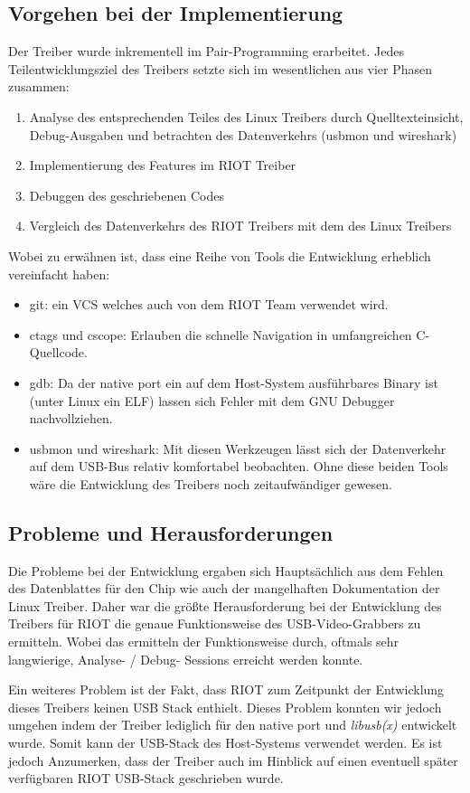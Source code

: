\subsection{Vorgehen bei der Implementierung}
Der Treiber wurde inkrementell im Pair-Programming erarbeitet. Jedes Teilentwicklungsziel des Treibers setzte sich im wesentlichen aus vier Phasen zusammen:
\begin{enumerate}
 \item Analyse des entsprechenden Teiles des Linux Treibers durch Quelltexteinsicht, Debug-Ausgaben und betrachten des Datenverkehrs (usbmon und wireshark)
 \item Implementierung des Features im RIOT Treiber
 \item Debuggen des geschriebenen Codes
 \item Vergleich des Datenverkehrs des RIOT Treibers mit dem des Linux Treibers
\end{enumerate}

Wobei zu erwähnen ist, dass eine Reihe von Tools die Entwicklung erheblich vereinfacht haben:
\begin{itemize}
 \item git: ein VCS welches auch von dem RIOT Team verwendet wird. 
 \item ctags und cscope: Erlauben die schnelle Navigation in umfangreichen C-Quellcode.
 \item gdb: Da der native port ein auf dem Host-System ausführbares Binary ist (unter Linux ein ELF) lassen sich Fehler mit dem GNU Debugger nachvollziehen.
 \item usbmon und wireshark: Mit diesen Werkzeugen lässt sich der Datenverkehr auf dem USB-Bus relativ komfortabel beobachten. Ohne diese beiden Tools wäre die Entwicklung des Treibers noch zeitaufwändiger gewesen. 
\end{itemize}

\subsection{Probleme und Herausforderungen}
Die Probleme bei der Entwicklung ergaben sich Hauptsächlich aus dem Fehlen des Datenblattes für den \stk{} Chip wie auch der mangelhaften Dokumentation der Linux Treiber. Daher war die größte Herausforderung bei der Entwicklung des Treibers für RIOT die genaue Funktionsweise des USB-Video-Grabbers zu ermitteln. Wobei das ermitteln der Funktionsweise durch, oftmals sehr langwierige, Analyse- / Debug- Sessions erreicht werden konnte.

Ein weiteres Problem ist der Fakt, dass RIOT zum Zeitpunkt der Entwicklung dieses Treibers keinen USB Stack enthielt. Dieses Problem konnten wir jedoch umgehen indem der Treiber lediglich für den native port und \emph{libusb(x)} entwickelt wurde. Somit kann der USB-Stack des Host-Systems verwendet werden. Es ist jedoch Anzumerken, dass der Treiber auch im Hinblick auf einen eventuell später verfügbaren RIOT USB-Stack geschrieben wurde.  